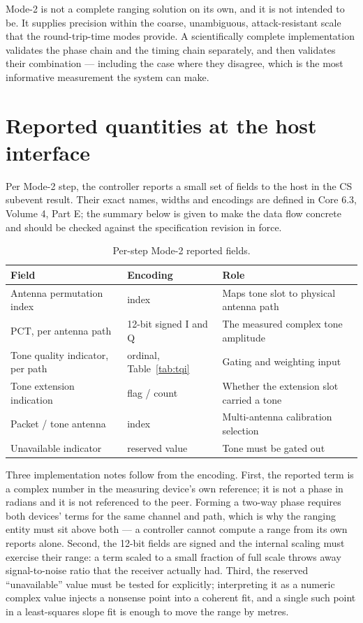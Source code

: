 \documentclass[11pt,a4paper]{article}
\newcommand{\PCT}{\mathrm{PCT}}
\begin{document}
Mode-2 is not a complete ranging solution on its own, and it is not intended to be. It supplies
precision within the coarse, unambiguous, attack-resistant scale that the round-trip-time modes
provide. A scientifically complete implementation validates the phase chain and the timing chain
separately, and then validates their combination --- including the case where they disagree, which
is the most informative measurement the system can make.

\appendix
\section{Reported quantities at the host interface}
\label{app:hci}

Per Mode-2 step, the controller reports a small set of fields to the host in the CS subevent result.
Their exact names, widths and encodings are defined in Core 6.3, Volume 4, Part E; the summary below
is given to make the data flow concrete and should be checked against the specification revision in
force.

\begin{table}[h]
\caption{Per-step Mode-2 reported fields.}
\label{tab:hci}
\centering\small
\begin{tabular}{@{}L{40mm}L{36mm}L{48mm}@{}}
\toprule
Field & Encoding & Role \\
\midrule
Antenna permutation index & index & Maps tone slot to physical antenna path \\
$\PCT$, per antenna path & 12-bit signed I and Q & The measured complex tone amplitude \\
Tone quality indicator, per path & ordinal, Table~\ref{tab:tqi} & Gating and weighting input \\
Tone extension indication & flag / count & Whether the extension slot carried a tone \\
Packet / tone antenna & index & Multi-antenna calibration selection \\
Unavailable indicator & reserved value & Tone must be gated out \\
\bottomrule
\end{tabular}
\end{table}

Three implementation notes follow from the encoding. First, the reported term is a complex number in
the measuring device's own reference; it is not a phase in radians and it is not referenced to the
peer. Forming a two-way phase requires both devices' terms for the same channel and path, which is
why the ranging entity must sit above both --- a controller cannot compute a range from its own
reports alone. Second, the 12-bit fields are signed and the internal scaling must exercise their
range: a term scaled to a small fraction of full scale throws away signal-to-noise ratio that the
receiver actually had. Third, the reserved ``unavailable'' value must be tested for explicitly;
interpreting it as a numeric complex value injects a nonsense point into a coherent fit, and a
single such point in a least-squares slope fit is enough to move the range by metres.
\end{document}
